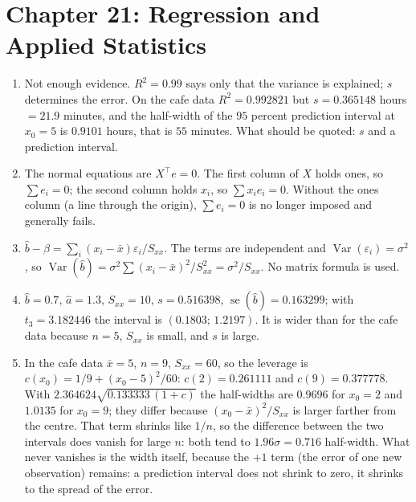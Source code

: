 \section*{Chapter 21: Regression and Applied Statistics}
\begin{enumerate}[label=\textbf{21.\arabic*}]
  \item Not enough evidence. $R^{2}=0.99$ says only that the variance is explained;
        $s$ determines the error. On the cafe data $R^{2}=0.992821$ but
        $s=0.365148$ hours $=21.9$ minutes, and the half-width of the $95$ percent
        prediction interval at $x_{0}=5$ is $0.9101$ hours, that is $55$ minutes. What
        should be quoted: $s$ and a prediction interval.

  \item The normal equations are $X^{\top}e=0$. The first column of $X$ holds ones, so
        $\sum e_{i}=0$; the second column holds $x_{i}$, so $\sum x_{i}e_{i}=0$.
        Without the ones column (a line through the origin), $\sum e_{i}=0$ is no longer
        imposed and generally fails.

  \item $\hat b-\beta=\sum_{i}(x_{i}-\bar x)\varepsilon_{i}/S_{xx}$. The terms are
        independent and $\operatorname{Var}(\varepsilon_{i})=\sigma^{2}$, so
        $\operatorname{Var}(\hat b)=\sigma^{2}\sum(x_{i}-\bar x)^{2}/S_{xx}^{2}
        =\sigma^{2}/S_{xx}$. No matrix formula is used.

  \item $\hat b=0.7$, $\hat a=1.3$, $S_{xx}=10$, $s=0.516398$,
        $\operatorname{se}(\hat b)=0.163299$; with $t_{3}=3.182446$ the interval is
        $(0.1803;\,1.2197)$. It is wider than for the cafe data because $n=5$,
        $S_{xx}$ is small, and $s$ is large.

  \item 
In the cafe data $\bar x=5$, $n=9$, $S_{xx}=60$, so the leverage is
        $c(x_{0})=1/9+(x_{0}-5)^{2}/60$: $c(2)=0.261111$ and $c(9)=0.377778$.
        With $2.364624\sqrt{0.133333\,(1+c)}$ the half-widths are $0.9696$ for
        $x_{0}=2$ and $1.0135$ for $x_{0}=9$; they differ because
        $(x_{0}-\bar x)^{2}/S_{xx}$ is larger farther from the centre. That term
        shrinks like $1/n$, so the difference between the two intervals does vanish
        for large $n$: both tend to $1.96\sigma=0.716$ half-width. What never
        vanishes is the width itself, because the $+1$ term (the error of one new
        observation) remains: a prediction interval does not shrink to zero, it
        shrinks to the spread of the error.


\end{enumerate}
